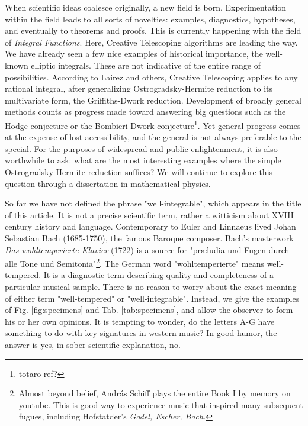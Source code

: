 \documentclass[nofootinbib,preprint]{revtex4-1}
\begin{document}
When scientific ideas coalesce originally, a new field is born. Experimentation within 
the field leads to all sorts of novelties: examples, diagnostics, 
hypotheses, and eventually to theorems and proofs. This is currently happening with the field 
of \textit{Integral Functions}. Here, Creative Telescoping algorithms are leading the way. 
We have already seen a few nice examples of historical importance, the well-known elliptic 
integrals. These are not indicative of the entire range of possibilities. According to Lairez 
and others, Creative Telescoping applies to any rational integral, after generalizing 
Ostrogradsky-Hermite reduction to its multivariate form, the Griffiths-Dwork reduction. 
Development of broadly general methods counts as progress made toward answering 
big questions such as the Hodge conjecture or the Bombieri-Dwork conjecture\footnote{totaro ref?}.
Yet general progress comes at the expense of lost accessibility, and the general is not 
always preferable to the special. For the purposes of widespread and public enlightenment, 
it is also worthwhile to ask: what are the most interesting examples where the simple 
Ostrogradsky-Hermite reduction suffices? We will continue to explore this question through
 a dissertation in mathematical physics.

So far we have not defined the phrase "well-integrable", which appears in the title
of this article. It is not a precise scientific term, rather a witticism about XVIII 
century history and language. Contemporary to Euler and Linnaeus lived Johan Sebastian 
Bach (1685-1750), the famous Baroque composer. Bach's masterwork \textit{Das wohltemperierte 
Klavier} (1722) is a source for "pr\ae ludia und Fugen durch alle Tone und Semitonia"\footnote{Almost 
beyond belief, Andr\'{a}s Schiff plays the entire Book I by memory on 
\href{https://www.youtube.com/watch?v=Ugc5FZsycAw}{youtube}. This is good way
to experience music that inspired many subsequent fugues, including Hofstatder's  \textit{Godel, Escher, Bach}.}. 
The German word "wohltemperierte" means well-tempered. It is a diagnostic term describing 
quality and completeness of a particular musical sample. There is no reason to worry about
the exact meaning of either term "well-tempered" or "well-integrable". 
Instead, we give the examples of Fig. \ref{fig:specimens} and Tab. \ref{tab:specimens}, 
and allow the observer to form his or her own opinions. It is tempting to wonder, do the 
letters A-G have something to do with key signatures in western music? In good humor, the
answer is yes, in sober scientific explanation, no. 
\end{document}
